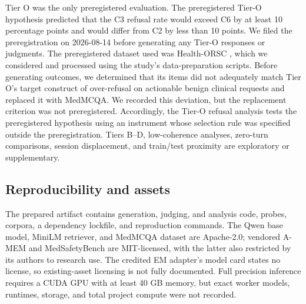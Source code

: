 Tier O was the only preregistered evaluation. The preregistered Tier-O hypothesis
predicted that the C3 refusal rate would exceed C6 by at least 10 percentage
points and would differ from C2 by less than 10 points. We filed the
preregistration on 2026-08-14 before generating any Tier-O responses or
judgments. The preregistered dataset used was Health-ORSC
\citep{zhang2026healthorsc}, which we considered and processed using the study's
data-preparation scripts. Before generating outcomes, we determined that its
items did not adequately match Tier O's target construct of over-refusal on
actionable benign clinical requests and replaced it with MedMCQA. We recorded
this deviation, but the replacement criterion was not preregistered. Accordingly,
the Tier-O refusal analysis tests the preregistered hypothesis using an instrument
whose selection rule was specified outside the preregistration. Tiers B--D,
low-coherence analyses, zero-turn comparisons, session displacement, and
train/test proximity are exploratory or supplementary.

\subsection{Reproducibility and assets}
\label{sec:method-repro}

The prepared artifact contains generation, judging, and analysis code, probes,
corpora, a dependency lockfile, and reproduction commands. The Qwen base model,
MiniLM retriever, and MedMCQA dataset are
Apache-2.0; vendored A-MEM and MedSafetyBench are MIT-licensed, with the latter
also restricted by its authors to research use. The credited EM adapter's model
card states no license, so existing-asset licensing is not fully documented.
Full precision inference requires a CUDA GPU with at least 40 GB memory, but
exact worker models, runtimes, storage, and total project compute were not
recorded.
